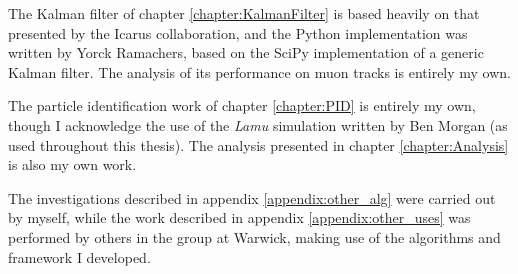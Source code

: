 The Kalman filter of chapter \ref{chapter:KalmanFilter} is based heavily on that presented by the Icarus collaboration, and the Python implementation was written by Yorck Ramachers, based on the SciPy implementation of a generic Kalman filter. The analysis of its performance on muon tracks is entirely my own.

The particle identification work of chapter \ref{chapter:PID} is entirely my own, though I acknowledge the use of the \emph{Lamu} simulation written by Ben Morgan (as used throughout this thesis). The analysis presented in chapter \ref{chapter:Analysis} is also my own work.

The investigations described in appendix \ref{appendix:other_alg} were carried out by myself, while the work described in appendix \ref{appendix:other_uses} was performed by others in the group at Warwick, making use of the algorithms and framework I developed. 
